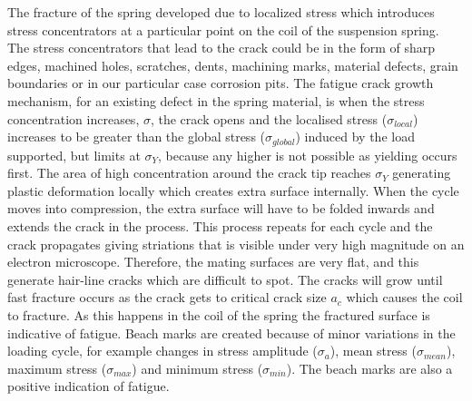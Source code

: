 \documentclass[11pt]{article}
\begin{document}
The fracture of the spring developed due to localized stress which introduces stress concentrators at a particular point on the coil of the suspension spring. The stress concentrators that lead to the crack could be in the form of sharp edges, machined holes, scratches, dents, machining marks, material defects, grain boundaries or in our particular case corrosion pits. The fatigue crack growth mechanism, for an existing defect in the spring material, is when the stress concentration increases, $\sigma$, the crack opens and the localised stress ($\sigma_{local}$) increases to be greater than the global stress ($\sigma_{global}$) induced by the load supported, but limits at $\sigma_Y$, because any higher is not possible as yielding occurs first. The area of high concentration around the crack tip reaches $\sigma_Y$ generating plastic deformation locally which creates extra surface internally. When the cycle moves into compression, the extra surface will have to be folded inwards and extends the crack in the process. This process repeats for each cycle and the crack propagates giving striations that is visible under very high magnitude on an electron microscope. Therefore, the mating surfaces are very flat, and this generate hair-line cracks which are difficult to spot. The cracks will grow until fast fracture occurs as the crack gets to critical crack size $a_c$ which causes the coil to fracture. As this happens in the coil of the spring the fractured surface is indicative of fatigue. Beach marks are created because of minor variations in the loading cycle, for example changes in stress amplitude ($\sigma_a$), mean stress ($\sigma_{mean}$), maximum stress ($\sigma_{max}$) and minimum stress ($\sigma_{min}$). The beach marks are also a positive indication of fatigue. 
\end{document}
